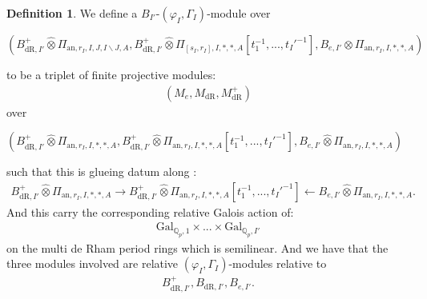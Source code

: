 \documentclass[12pt]{amsart}
\theoremstyle{definition}
\newtheorem{definition}[theorem]{Definition}
\numberwithin{equation}{section}
\begin{document}
\begin{definition}
We define a $B_{I'}$-$(\varphi_I,\Gamma_I)$-module over
\begin{center}
$(B^+_{\mathrm{dR},I'}	\widehat{\otimes}\Pi_{\mathrm{an},r_{I},I,J,I\backslash J,A},B^+_{\mathrm{dR},I'}	\widehat{\otimes}\Pi_{[s_I,r_I],I,*,*,A}[t_1^{-1},...,t_I'^{-1}],B_{e,I'}	\widehat{\otimes}\Pi_{\mathrm{an},r_{I},I,*,*,A})$	
\end{center}
to be a triplet of finite projective modules:
\begin{align}
(M_e,M_{\mathrm{dR}},M^+_{\mathrm{dR}})	
\end{align}
over 
\begin{center}
$(B^+_{\mathrm{dR},I'}	\widehat{\otimes}\Pi_{\mathrm{an},r_{I},I,*,*,A},B^+_{\mathrm{dR},I'}	\widehat{\otimes}\Pi_{\mathrm{an},r_{I},I,*,*,A}[t_1^{-1},...,t_I'^{-1}],B_{e,I'}	\widehat{\otimes}\Pi_{\mathrm{an},r_{I},I,*,*,A})$	
\end{center}
such that this is glueing datum along :
\begin{align}
B^+_{\mathrm{dR},I'}	\widehat{\otimes}\Pi_{\mathrm{an},r_{I},I,*,*,A}\rightarrow B^+_{\mathrm{dR},I'}	\widehat{\otimes}\Pi_{\mathrm{an},r_{I},I,*,*,A}[t_1^{-1},...,t_I'^{-1}] \leftarrow B_{e,I'}	\widehat{\otimes}\Pi_{\mathrm{an},r_{I},I,*,*,A}.	
\end{align}
And this carry the corresponding relative Galois action of:
\begin{align}
\mathrm{Gal}_{\mathbb{Q}_p,1}\times...\times \mathrm{Gal}_{\mathbb{Q}_p,I'}		
\end{align}
on the multi de Rham period rings which is semilinear. And we have that the three modules involved are relative $(\varphi_I,\Gamma_I)$-modules relative to
\begin{align}
B^+_{\mathrm{dR},I'},B_{\mathrm{dR},I'},B_{e,I'}.	
\end{align}

	
\end{definition}
\end{document}
